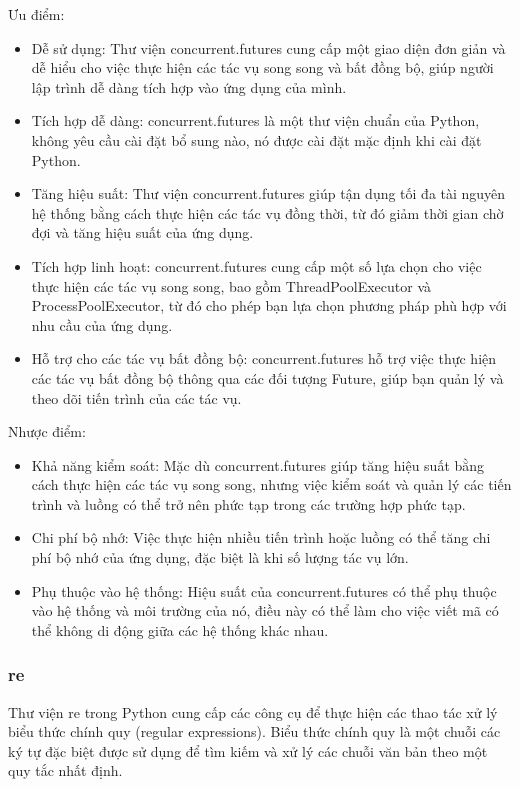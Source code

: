 \documentclass{article} %
\begin{document}
Ưu điểm:
\begin{itemize}
    \item Dễ sử dụng: Thư viện concurrent.futures cung cấp một giao diện đơn giản và dễ hiểu cho việc thực hiện các tác vụ song song và bất đồng bộ, giúp người lập trình dễ dàng tích hợp vào ứng dụng của mình.
    \item Tích hợp dễ dàng: concurrent.futures là một thư viện chuẩn của Python, không yêu cầu cài đặt bổ sung nào, nó được cài đặt mặc định khi cài đặt Python.
    \item Tăng hiệu suất: Thư viện concurrent.futures giúp tận dụng tối đa tài nguyên hệ thống bằng cách thực hiện các tác vụ đồng thời, từ đó giảm thời gian chờ đợi và tăng hiệu suất của ứng dụng.
    \item Tích hợp linh hoạt: concurrent.futures cung cấp một số lựa chọn cho việc thực hiện các tác vụ song song, bao gồm ThreadPoolExecutor và ProcessPoolExecutor, từ đó cho phép bạn lựa chọn phương pháp phù hợp với nhu cầu của ứng dụng.
    \item Hỗ trợ cho các tác vụ bất đồng bộ: concurrent.futures hỗ trợ việc thực hiện các tác vụ bất đồng bộ thông qua các đối tượng Future, giúp bạn quản lý và theo dõi tiến trình của các tác vụ.
\end{itemize}
\hspace{0.0em} Nhược điểm:
\begin{itemize}
    \item Khả năng kiểm soát: Mặc dù concurrent.futures giúp tăng hiệu suất bằng cách thực hiện các tác vụ song song, nhưng việc kiểm soát và quản lý các tiến trình và luồng có thể trở nên phức tạp trong các trường hợp phức tạp.
    \item Chi phí bộ nhớ: Việc thực hiện nhiều tiến trình hoặc luồng có thể tăng chi phí bộ nhớ của ứng dụng, đặc biệt là khi số lượng tác vụ lớn.
    \item Phụ thuộc vào hệ thống: Hiệu suất của concurrent.futures có thể phụ thuộc vào hệ thống và môi trường của nó, điều này có thể làm cho việc viết mã có thể không di động giữa các hệ thống khác nhau.
\end{itemize}
\subsubsection{re}
Thư viện re trong Python cung cấp các công cụ để thực hiện các thao tác xử lý biểu thức chính quy (regular expressions). Biểu thức chính quy là một chuỗi các ký tự đặc biệt được sử dụng để tìm kiếm và xử lý các chuỗi văn bản theo một quy tắc nhất định.
\end{document}
